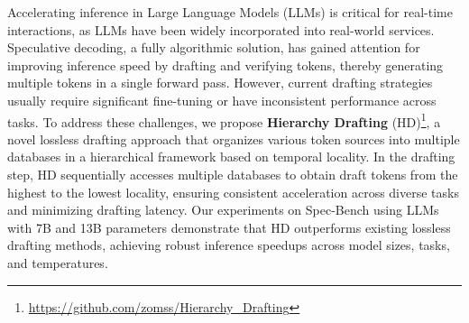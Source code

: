 Accelerating inference in Large Language Models (LLMs) is critical for real-time interactions, as LLMs have been widely incorporated into real-world services.  Speculative decoding, a fully algorithmic solution, has gained attention for improving inference speed by drafting and verifying tokens, thereby generating multiple tokens in a single forward pass. However, current drafting strategies usually require significant fine-tuning or have inconsistent performance across tasks.
To address these challenges, we propose \textbf{Hierarchy Drafting} (HD)\footnote{\scriptsize \url{https://github.com/zomss/Hierarchy_Drafting}}, a novel lossless drafting approach that organizes various token sources into multiple databases in a hierarchical framework based on temporal locality. 
In the drafting step, HD sequentially accesses multiple databases to obtain draft tokens from the highest to the lowest locality, ensuring consistent acceleration across diverse tasks and minimizing drafting latency.
Our experiments on Spec-Bench using LLMs with 7B and 13B parameters demonstrate that HD outperforms existing lossless drafting methods, achieving robust inference speedups across model sizes, tasks, and temperatures.